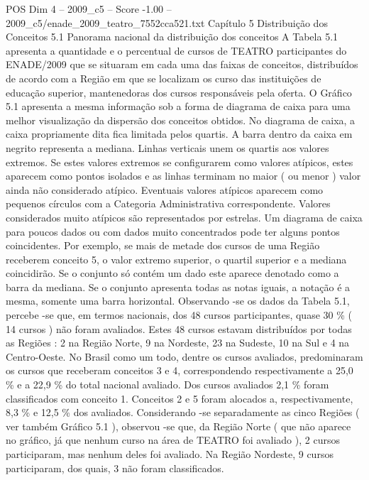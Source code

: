 \begin{textsample}{POS Dim 4 – 2009\_c5 – Score -1.00 – 2009\_c5/enade\_2009\_teatro\_7552cca521.txt}  \label{ex:f4_pos_263}
Capítulo 5 Distribuição dos Conceitos 5.1 Panorama nacional da distribuição dos conceitos A Tabela 5.1 apresenta a quantidade e o percentual de cursos de TEATRO participantes do ENADE/2009 que se situaram em cada uma das faixas de conceitos, distribuídos de acordo com a Região em que se localizam os curso das instituições de educação superior, mantenedoras dos cursos responsáveis pela oferta.
O Gráfico 5.1 apresenta a mesma informação sob a forma de diagrama de caixa para uma melhor visualização da dispersão dos conceitos obtidos.
No diagrama de caixa, a caixa propriamente dita fica limitada pelos quartis.
A barra dentro da caixa em negrito representa a mediana.
Linhas verticais unem os quartis aos valores extremos.
Se estes valores extremos se configurarem como valores atípicos, estes aparecem como pontos isolados e as linhas terminam no maior ( ou menor ) valor ainda não considerado atípico.
Eventuais valores atípicos aparecem como pequenos círculos com a Categoria Administrativa correspondente.
Valores considerados muito atípicos são representados por estrelas.
Um diagrama de caixa para poucos dados ou com dados muito concentrados pode ter alguns pontos coincidentes.
Por exemplo, se mais de metade dos cursos de uma Região receberem conceito 5, o valor extremo superior, o quartil superior e a mediana coincidirão.
Se o conjunto só contém um dado este aparece denotado como a barra da mediana.
Se o conjunto apresenta todas as notas iguais, a notação é a mesma, somente uma barra horizontal.
Observando -se os dados da Tabela 5.1, percebe -se que, em termos nacionais, dos 48 cursos participantes, quase 30 \% ( 14 cursos ) não foram avaliados.
Estes 48 cursos estavam distribuídos por todas as Regiões : 2 na Região Norte, 9 na Nordeste, 23 na Sudeste, 10 na Sul e 4 na Centro-Oeste.
No Brasil como um todo, dentre os cursos avaliados, predominaram os cursos que receberam conceitos 3 e 4, correspondendo respectivamente a 25,0 \% e a 22,9 \% do total nacional avaliado.
Dos cursos avaliados 2,1 \% foram classificados com conceito 1.
Conceitos 2 e 5 foram alocados a, respectivamente, 8,3 \% e 12,5 \% dos avaliados.
Considerando -se separadamente as cinco Regiões ( ver também Gráfico 5.1 ), observou -se que, da Região Norte ( que não aparece no gráfico, já que nenhum curso na área de TEATRO foi avaliado ), 2 cursos participaram, mas nenhum deles foi avaliado.
Na Região Nordeste, 9 cursos participaram, dos quais, 3 não foram classificados.

\end{textsample}
